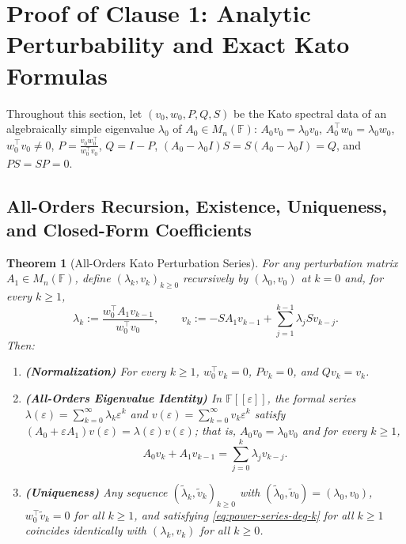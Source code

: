 \documentclass[11pt,a4paper]{article}
\newtheorem{theorem}{Theorem}[section]
\theoremstyle{definition}
\begin{document}
\section{Proof of Clause 1: Analytic Perturbability and Exact Kato Formulas}

Throughout this section, let $(v_0, w_0, P, Q, S)$ be the Kato spectral data of an
algebraically simple eigenvalue $\lambda_0$ of $A_0 \in M_n(\mathbb{F})$:
$A_0 v_0 = \lambda_0 v_0$, $A_0^\top w_0 = \lambda_0 w_0$, $w_0^\top v_0 \neq 0$,
$P = \frac{v_0 w_0^\top}{w_0^\top v_0}$, $Q = I - P$, $(A_0 - \lambda_0 I)S =
S(A_0 - \lambda_0 I) = Q$, and $PS = SP = 0$.

\subsection{All-Orders Recursion, Existence, Uniqueness, and Closed-Form Coefficients}

\begin{theorem}[All-Orders Kato Perturbation Series]\label{thm:all-orders}
For any perturbation matrix $A_1 \in M_n(\mathbb{F})$, define $(\lambda_k, v_k)_{k \ge 0}$
recursively by $(\lambda_0, v_0)$ at $k = 0$ and, for every $k \ge 1$,
\begin{equation}\label{eq:kato-recursion}
  \lambda_k := \frac{w_0^\top A_1 v_{k-1}}{w_0^\top v_0}, \qquad
  v_k := - S A_1 v_{k-1} + \sum_{j=1}^{k-1} \lambda_j S v_{k-j}.
\end{equation}
Then:
\begin{enumerate}
  \item \textbf{(Normalization)} For every $k \ge 1$, $w_0^\top v_k = 0$, $P v_k = 0$,
  and $Q v_k = v_k$.
  \item \textbf{(All-Orders Eigenvalue Identity)} In $\mathbb{F}[[\varepsilon]]$, the
  formal series $\lambda(\varepsilon) = \sum_{k=0}^\infty \lambda_k \varepsilon^k$ and
  $v(\varepsilon) = \sum_{k=0}^\infty v_k \varepsilon^k$ satisfy
  $(A_0 + \varepsilon A_1) v(\varepsilon) = \lambda(\varepsilon) v(\varepsilon)$; that
  is, $A_0 v_0 = \lambda_0 v_0$ and for every $k \ge 1$,
  \begin{equation}\label{eq:power-series-deg-k}
    A_0 v_k + A_1 v_{k-1} = \sum_{j=0}^k \lambda_j v_{k-j}.
  \end{equation}
  \item \textbf{(Uniqueness)} Any sequence $(\tilde{\lambda}_k, \tilde{v}_k)_{k \ge 0}$
  with $(\tilde{\lambda}_0, \tilde{v}_0) = (\lambda_0, v_0)$, $w_0^\top \tilde{v}_k = 0$
  for all $k \ge 1$, and satisfying \eqref{eq:power-series-deg-k} for all $k \ge 1$
  coincides identically with $(\lambda_k, v_k)$ for all $k \ge 0$.
\end{enumerate}
\end{theorem}
\end{document}
